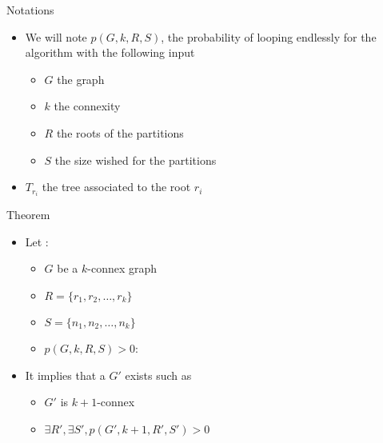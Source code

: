 
\begin{frame}{Notations}
  \begin{itemize}
  \item We will note $p(G,k,R,S)$, the probability
    of looping endlessly for the algorithm with the following input
    \begin{itemize}
      \item $G$ the graph
      \item $k$ the connexity
      \item $R$ the roots of the partitions
      \item $S$ the size wished for the partitions
    \end{itemize}
  \item $T_{r_i}$ the tree associated to the root $r_i$
  \end{itemize}
\end{frame}

\begin{frame}{Theorem}
  \begin{itemize}
  \item Let :
    \begin{itemize}
    \item $G$ be a $k$-connex graph
    \item $R = \{r_1,r_2, \dots, r_k\}$
    \item $S = \{n_1,n_2, \dots, n_k\}$
    \item $p(G,k,R,S) > 0$:
    \end{itemize}
  \item It implies that a $G'$ exists such as
    \begin{itemize}
    \item $G'$ is $k+1$-connex
    \item $\exists R', \exists S', p(G',k + 1, R', S') > 0$
    \end{itemize}
  \end{itemize}
\end{frame}

